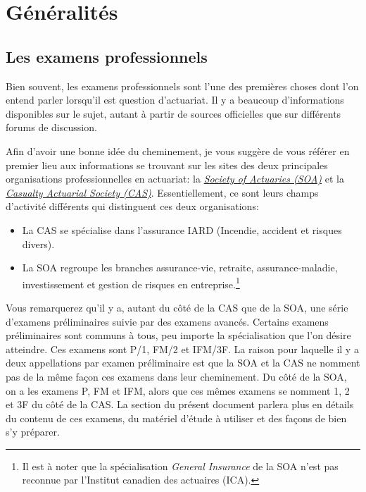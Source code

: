 \section*{Généralités}
\label{sec:generalites}

\subsection*{Les examens professionnels}
\label{subsec:examsprofs}
\captionsetup{justification=centering}
Bien souvent, les examens professionnels sont l'une des premières choses dont l'on entend parler lorsqu'il est question d'actuariat. Il y a beaucoup d'informations disponibles sur le sujet, autant à partir de sources officielles que sur différents forums de discussion.\vspace{\baselineskip}

Afin d'avoir une bonne idée du cheminement, je vous suggère de vous référer en premier lieu aux informations se trouvant sur les sites des deux principales organisations professionnelles en actuariat: la \href{https://soa.org/member/}{\emph{Society of Actuaries (SOA)}} et la \href{http://www.casact.org/}{\emph{Casualty Actuarial Society (CAS)}}. Essentiellement, ce sont leurs champs d'activité différents qui distinguent ces deux organisations:
\begin{itemize}
\item La CAS se spécialise dans l'assurance IARD (Incendie, accident et risques divers).
\item La SOA regroupe les branches assurance-vie, retraite, assurance-maladie, investissement et gestion de risques en entreprise.\footnote{ Il est à noter que la spécialisation \emph{General Insurance} de la SOA n'est pas reconnue par l'Institut canadien des actuaires (ICA).}
\end{itemize}
\vspace{\baselineskip}

Vous remarquerez qu'il y a, autant du côté de la CAS que de la SOA, une série d'examens préliminaires suivie par des examens avancés. Certains examens préliminaires sont communs à tous, peu importe la spécialisation que l'on désire atteindre. Ces examens sont P/1, FM/2 et IFM/3F. La raison pour laquelle il y a deux appellations par examen préliminaire est que la SOA et la CAS ne nomment pas de la même façon ces examens dans leur cheminement. Du côté de la SOA, on a les examens P, FM et IFM, alors que ces mêmes examens se nomment 1, 2 et 3F du côté de la CAS. La section  du présent document parlera plus en détails du contenu de ces examens, du matériel d'étude à utiliser et des façons de bien s'y préparer.\vspace{\baselineskip}

